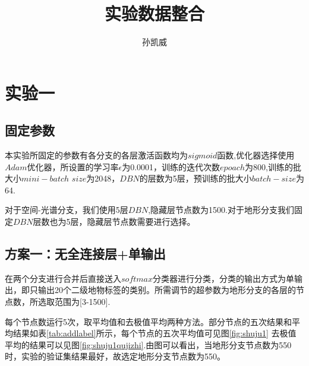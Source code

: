 \documentclass[lang=cn,11pt,a4paper,cite=authoryear]{elegantpaper}
\title{实验数据整合}
\author{孙凯威}
\institute{\href{sunkaiwei@cug.edu.cn}{中国地质大学（武汉）}}
\date{\zhtoday}
\begin{document}
\maketitle

\section{实验一}

\subsection{固定参数}

本实验所固定的参数有各分支的各层激活函数均为$sigmoid$函数,优化器选择使用$Adam$优化器，所设置的学习率$\epsilon$为0.0001，训练的迭代次数$epoach$为800,训练的批大小$mini-batch$ $size$为2048，$DBN$的层数为5层，预训练的批大小$batch-size$为64.

对于空间-光谱分支，我们使用5层$DBN$,隐藏层节点数为1500.对于地形分支我们固定$DBN$层数也为5层，隐藏层节点数需要进行选择。

\subsection{方案一：无全连接层+单输出}
在两个分支进行合并后直接送入$softmax$分类器进行分类，分类的输出方式为单输出，即只输出20个二级地物标签的类别。所需调节的超参数为地形分支的各层的节点数，所选取范围为[3-1500].

每个节点数运行5次，取平均值和去极值平均两种方法。部分节点的五次结果和平均结果如表\ref{tab:addlabel}所示，每个节点的五次平均值可见图\ref{fig:shuju1}
去极值平均的结果可以见图\ref{fig:shuju1qujizhi}.由图可以看出，当地形分支节点数为550时，实验的验证集结果最好，故选定地形分支节点数为550。
\end{document}
